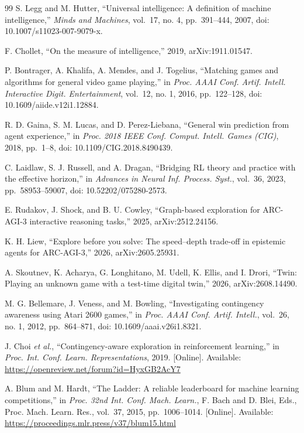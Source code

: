 \documentclass[journal]{IEEEtran}
\begin{document}
\begin{thebibliography}{99}
S. Legg and M. Hutter, ``Universal intelligence: A definition of machine
intelligence,'' \emph{Minds and Machines}, vol.~17, no. 4, pp.~391--444,
2007, doi: 10.1007/s11023-007-9079-x.

F. Chollet, ``On the measure of intelligence,'' 2019, arXiv:1911.01547.

P. Bontrager, A. Khalifa, A. Mendes, and J. Togelius, ``Matching games
and algorithms for general video game playing,'' in \emph{Proc. AAAI
Conf. Artif. Intell. Interactive Digit. Entertainment}, vol.~12, no. 1,
2016, pp.~122--128, doi: 10.1609/aiide.v12i1.12884.

R. D. Gaina, S. M. Lucas, and D. Perez-Liebana, ``General win prediction
from agent experience,'' in \emph{Proc. 2018 IEEE Conf. Comput. Intell.
Games (CIG)}, 2018, pp.~1--8, doi: 10.1109/CIG.2018.8490439.

C. Laidlaw, S. J. Russell, and A. Dragan, ``Bridging RL theory and
practice with the effective horizon,'' in \emph{Advances in Neural Inf.
Process. Syst.}, vol.~36, 2023, pp.~58953--59007, doi:
10.52202/075280-2573.

E. Rudakov, J. Shock, and B. U. Cowley, ``Graph-based exploration for
ARC-AGI-3 interactive reasoning tasks,'' 2025, arXiv:2512.24156.

K. H. Liew, ``Explore before you solve: The speed--depth trade-off in
epistemic agents for ARC-AGI-3,'' 2026, arXiv:2605.25931.

A. Skoutnev, K. Acharya, G. Longhitano, M. Udell, K. Ellis, and I.
Drori, ``Twin: Playing an unknown game with a test-time digital twin,''
2026, arXiv:2608.14490.

M. G. Bellemare, J. Veness, and M. Bowling, ``Investigating contingency
awareness using Atari 2600 games,'' in \emph{Proc. AAAI Conf. Artif.
Intell.}, vol.~26, no. 1, 2012, pp.~864--871, doi:
10.1609/aaai.v26i1.8321.

J. Choi \emph{et al.}, ``Contingency-aware exploration in reinforcement
learning,'' in \emph{Proc. Int. Conf. Learn. Representations}, 2019.
{[}Online{]}. Available:
\url{https://openreview.net/forum?id=HyxGB2AcY7}

A. Blum and M. Hardt, ``The Ladder: A reliable leaderboard for machine
learning competitions,'' in \emph{Proc. 32nd Int. Conf. Mach. Learn.},
F. Bach and D. Blei, Eds., Proc. Mach. Learn. Res., vol.~37, 2015,
pp.~1006--1014. {[}Online{]}. Available:
\url{https://proceedings.mlr.press/v37/blum15.html}


\end{thebibliography}
\end{document}
